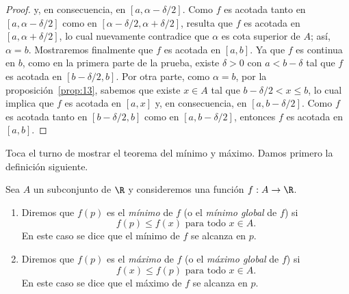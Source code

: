 \documentclass[12pt,a4paper]{book}
\begin{document}
\begin{proof}
        y, en consecuencia, en $[a,\alpha-\delta/2]$. Como $f$ es acotada tanto en $[a,\alpha-\delta/2]$
        como en $[\alpha-\delta/2,\alpha+\delta/2]$, resulta que $f$ es acotada en $[a,\alpha+\delta/2]$, lo cual
        nuevamente contradice que $\alpha$ es cota superior de $A$; así, $\alpha=b$. Mostraremos
        finalmente que $f$ es acotada en $[a,b]$. Ya que $f$ es continua en $b$, como en la
        primera parte de la prueba, existe $\delta>0$ con $a<b-\delta$ tal que $f$ es acotada en
        $[b-\delta/2,b]$. Por otra parte, como $\alpha=b$, por la proposición~\ref{prop:13}, sabemos que
        existe $x\in A$ tal que $b-\delta/2<x\leq b$, lo cual implica que $f$ es acotada en $[a,x]$
        y, en consecuencia, en $[a,b-\delta/2]$. Como $f$ es acotada tanto en $[b-\delta/2,b]$
        como en $[a,b-\delta/2]$, entonces $f$ es acotada en $[a,b]$.
    \end{proof}

    Toca el turno de mostrar el teorema del mínimo y máximo. Damos primero
    la definición siguiente.

    \begin{definicion}\label{def:41}
        Sea $A$ un
        subconjunto de $\R$ y consideremos una función $f:A\to\R$.
        \begin{enumerate}
            \item Diremos que $f(p)$ es el \textit{mínimo} de $f$ (o el \textit{mínimo global} de $f$) si
            \begin{equation*}
                f(p)\leq f(x)\text{ para todo }x\in A.
            \end{equation*}
            En este caso se dice que el mínimo de $f$ se alcanza en $p$.
            \item Diremos que $f(p)$ es el \textit{máximo} de $f$ (o el \textit{máximo global} de $f$) si
            \begin{equation*}
                f(x)\leq f(p)\text{ para todo }x\in A.
            \end{equation*}
            En este caso se dice que el máximo de $f$ se alcanza en $p$.
        \end{enumerate}
    \end{definicion}
\end{document}
